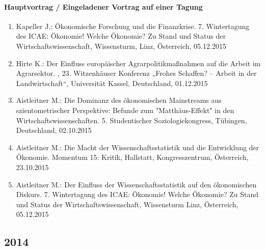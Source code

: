 \paragraph{Hauptvortrag / Eingeladener Vortrag auf einer Tagung}
\begin{enumerate}
	\item Kapeller J.: Ökonomische Forschung und die Finanzkrise. 7. Wintertagung des ICAE: Ökonomie! Welche Ökonomie? Zu Stand und Status der Wirtschaftswissenschaft, Wissensturm, Linz, Österreich, 05.12.2015
	\item Hirte K.: Der Einfluss europäischer Agrarpolitikmaßnahmen auf die Arbeit im Agrarsektor. , 23. Witzenhäuser Konferenz „Frohes Schaffen? – Arbeit in der Landwirtschaft“, Universität Kassel, Deutschland, 01.12.2015
	\item Aistleitner M.: Die Dominanz des ökonomischen Mainstreams aus szientometrischer Perspektive: Befunde zum "Matthäus-Effekt" in den Wirtschaftswissenschaften. 5. Studentischer Soziologiekongress, Tübingen, Deutschland, 02.10.2015
	\item Aistleitner M.: Die Macht der Wissenschaftsstatistik und die Entwicklung der Ökonomie. Momentum 15: Kritik, Hallstatt, Kongresszentrum, Österreich, 23.10.2015
	\item Aistleitner M.: Der Einfluss der Wissenschaftsstatistik auf den ökonomischen Diskurs. 7. Wintertagung des ICAE: Ökonomie! Welche Ökonomie? Zu Stand und Status der Wirtschaftswissenschaft, Wissensturm Linz, Österreich, 05.12.2015
\end{enumerate}
\subsection*{2014}

